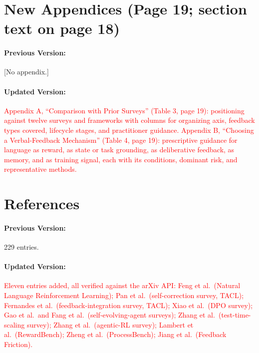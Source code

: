 \documentclass[11pt]{article}
\newcommand{\red}[1]{\textcolor{red}{#1}}
\begin{document}
\section{New Appendices (Page 19; section text on page 18)}

\paragraph{Previous Version:} [No appendix.]

\paragraph{Updated Version:} \red{Appendix A, ``Comparison with Prior Surveys'' (Table 3, page 19): positioning against twelve surveys and frameworks with columns for organizing axis, feedback types covered, lifecycle stages, and practitioner guidance. Appendix B, ``Choosing a Verbal-Feedback Mechanism'' (Table 4, page 19): prescriptive guidance for language as reward, as state or task grounding, as deliberative feedback, as memory, and as training signal, each with its conditions, dominant risk, and representative methods.}

\section{References}

\paragraph{Previous Version:} 229 entries.

\paragraph{Updated Version:} \red{Eleven entries added, all verified against the arXiv API: Feng et al.\ (Natural Language Reinforcement Learning); Pan et al.\ (self-correction survey, TACL); Fernandes et al.\ (feedback-integration survey, TACL); Xiao et al.\ (DPO survey); Gao et al.\ and Fang et al.\ (self-evolving-agent surveys); Zhang et al.\ (test-time-scaling survey); Zhang et al.\ (agentic-RL survey); Lambert et al.\ (RewardBench); Zheng et al.\ (ProcessBench); Jiang et al.\ (Feedback Friction).}
\end{document}
